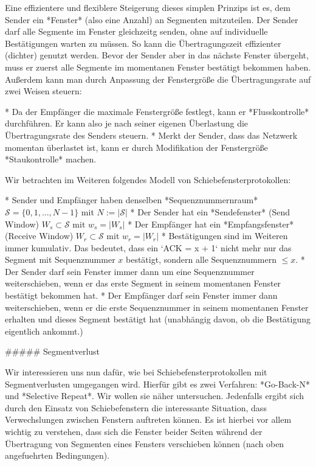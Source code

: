Eine effizientere und flexiblere Steigerung dieses simplen Prinzips ist es, dem
Sender ein *Fenster* (also eine Anzahl) an Segmenten mitzuteilen. Der Sender
darf alle Segmente im Fenster gleichzeitg senden, ohne auf individuelle
Bestätigungen warten zu müssen. So kann die Übertragungszeit effizienter
(dichter) genutzt werden. Bevor der Sender aber in das nächste Fenster übergeht,
muss er zuerst alle Segmente im momentanen Fenster bestätigt bekommen
haben. Außerdem kann man durch Anpassung der Fenstergröße die Übertragungsrate
auf zwei Weisen steuern:

* Da der Empfänger die maximale Fenstergröße festlegt, kann er *Flusskontrolle*
  durchführen. Er kann also je nach seiner eigenen Überlastung die
  Übertragungsrate des Senders steuern.
* Merkt der Sender, dass das Netzwerk momentan überlastet ist, kann er durch
  Modifikation der Fenstergröße *Staukontrolle* machen.

Wir betrachten im Weiteren folgendes Modell von Schiebefensterprotokollen:

* Sender und Empfänger haben denselben *Sequenznummernraum* $\mathcal{S} = \{0, 1,
  ..., N - 1\}$ mit $N := |\mathcal{S}|$
* Der Sender hat ein *Sendefenster* (Send Window) $W_s \subset \mathcal{S}$ mit
  $w_s = |W_s|$
* Der Empfänger hat ein *Empfangsfenster* (Receive Window) $W_r \subset
  \mathcal{S}$ mit $w_r = |W_r|$
* Bestätigungen sind im Weiteren immer kumulativ. Das bedeutet, dass ein `ACK
  = x + 1` nicht mehr nur das Segment mit Sequenznummer $x$ bestätigt, sondern
  alle Sequenznummern $\leq x$.
* Der Sender darf sein Fenster immer dann um eine Sequenznummer
  weiterschieben, wenn er das erste Segment in seinem momentanen Fenster
  bestätigt bekommen hat.
* Der Empfänger darf sein Fenster immer dann weiterschieben, wenn er die erste
  Sequenznummer in seinem momentanen Fenster erhalten und dieses Segment
  bestätigt hat (unabhängig davon, ob die Bestätigung eigentlich ankommt.)

##### Segmentverlust

Wir interessieren uns nun dafür, wie bei Schiebefensterprotokollen mit
Segmentverlusten umgegangen wird. Hierfür gibt es zwei Verfahren: *Go-Back-N*
und *Selective Repeat*. Wir wollen sie näher untersuchen. Jedenfalls ergibt sich
durch den Einsatz von Schiebefenstern die interessante Situation, dass
Verwechslungen zwischen Fenstern auftreten können. Es ist hierbei vor allem
wichtig zu verstehen, dass sich die Fenster beider Seiten während der
Übertragung von Segmenten eines Fensters verschieben können (nach oben
angefuehrten Bedingungen).

